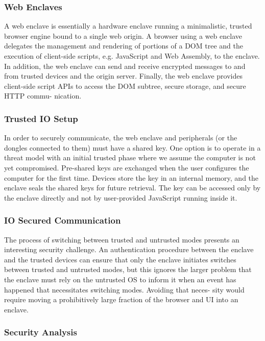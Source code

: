 \documentclass{article}
\begin{document}
\subsubsection{Web Enclaves}

A web enclave is essentially a hardware enclave running
a minimalistic, trusted browser engine bound to a single
web origin. A browser using a web enclave delegates the
management and rendering of portions of a DOM tree
and the execution of client-side scripts, e.g. JavaScript
and Web Assembly, to the enclave. In addition, the web
enclave can send and receive encrypted messages to and
from trusted devices and the origin server. Finally, the
web enclave provides client-side script APIs to access the
DOM subtree, secure storage, and secure HTTP commu-
nication.

\subsubsection{Trusted IO Setup}

In order to securely communicate, the web enclave and peripherals (or the dongles connected to them) must have a shared key. One option is to operate in a threat model with an initial trusted phase where we assume the computer is not yet compromised. Pre-shared keys are exchanged when the user configures the computer for the first time. Devices store the key in an internal memory, and the enclave seals the shared keys for future retrieval. The key can be accessed only by the enclave directly and not by user-provided JavaScript running inside it.

\subsubsection{IO Secured Communication}

The process of switching between trusted and untrusted
modes presents an interesting security challenge. An
authentication procedure between the enclave and the
trusted devices can ensure that only the enclave initiates
switches between trusted and untrusted modes, but this
ignores the larger problem that the enclave must rely on
the untrusted OS to inform it when an event has happened
that necessitates switching modes. Avoiding that neces-
sity would require moving a prohibitively large fraction
of the browser and UI into an enclave.

\subsubsection{Security Analysis}
\end{document}
